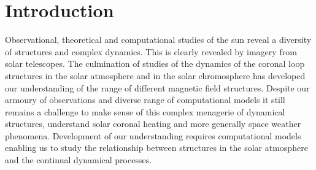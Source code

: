\documentclass[twocolumn]{aastex62}
\begin{document}

\section{Introduction} \label{sec:intro}

Observational, theoretical and computational studies of the sun reveal a diversity of  structures and complex dynamics. This is clearly revealed by imagery from solar telescopes. The culmination of studies of the dynamics of the coronal loop structures  in the solar atmosphere and in the solar chromosphere has developed our understanding of the range of different magnetic field structures. %
Despite our armoury of observations and diverse range of computational models it still remains a challenge to make sense of this complex menagerie of dynamical structures, understand solar coronal heating and more generally space weather phenomena. Development of our understanding requires computational models enabling us to study the relationship between structures in the solar atmosphere and the continual dynamical processes.

\end{document}
